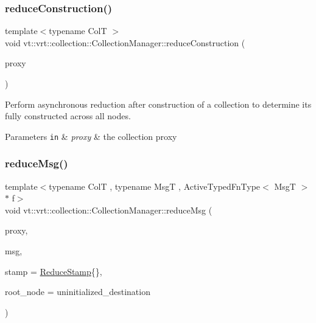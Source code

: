 \subsubsection{\texorpdfstring{reduce\+Construction()}{reduceConstruction()}}
{\footnotesize\ttfamily template$<$typename ColT $>$ \\
void vt\+::vrt\+::collection\+::\+Collection\+Manager\+::reduce\+Construction (\begin{DoxyParamCaption}\item[{\hyperlink{namespacevt_a1b417dd5d684f045bb58a0ede70045ac}{Virtual\+Proxy\+Type} const \&}]{proxy }\end{DoxyParamCaption})\hspace{0.3cm}{\ttfamily [static]}}



Perform asynchronous reduction after construction of a collection to determine it\textquotesingle{}s fully constructed across all nodes. 


\begin{DoxyParams}[1]{Parameters}
\mbox{\tt in}  & {\em proxy} & the collection proxy \\
\hline
\end{DoxyParams}
\mbox{\label{structvt_1_1vrt_1_1collection_1_1_collection_manager_a73e0a7bd12d524cb1d723fb1dc13ffe2}} 
\subsubsection{\texorpdfstring{reduce\+Msg()}{reduceMsg()}\hspace{0.1cm}{\footnotesize\ttfamily [1/2]}}
{\footnotesize\ttfamily template$<$typename ColT , typename MsgT , Active\+Typed\+Fn\+Type$<$ Msg\+T $>$ $\ast$ f$>$ \\
void vt\+::vrt\+::collection\+::\+Collection\+Manager\+::reduce\+Msg (\begin{DoxyParamCaption}\item[{\hyperlink{structvt_1_1vrt_1_1collection_1_1_collection_manager_a56458ed7f9bb22b631b9b3a745f42f94}{Collection\+Proxy\+Wrap\+Type}$<$ ColT $>$ const \&}]{proxy,  }\item[{MsgT $\ast$const}]{msg,  }\item[{\hyperlink{structvt_1_1vrt_1_1collection_1_1_collection_manager_ae8aac19e0ae07e9225142e5880eac830}{Reduce\+Stamp}}]{stamp = {\ttfamily \hyperlink{structvt_1_1vrt_1_1collection_1_1_collection_manager_ae8aac19e0ae07e9225142e5880eac830}{Reduce\+Stamp}\{\}},  }\item[{\hyperlink{namespacevt_a866da9d0efc19c0a1ce79e9e492f47e2}{Node\+Type}}]{root\+\_\+node = {\ttfamily uninitialized\+\_\+destination} }\end{DoxyParamCaption})}



